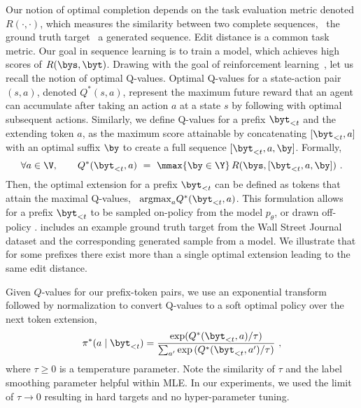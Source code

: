 Our notion of optimal completion depends on the task evaluation metric denoted $R(\cdot, \cdot)$, which measures
the similarity between two complete sequences, \eg~the ground truth
target \vs~a generated sequence. Edit distance is a common task metric.
Our goal in sequence learning is to train a model, which achieves high scores of $R(\bys,\byt)$.
Drawing  with the goal of reinforcement learning~\citep{suttonbarto98}, let us recall the notion of optimal Q-values.
Optimal Q-values for a state-action pair $(s,a)$, denoted $Q^*(s,a)$, represent the maximum future reward that an agent can accumulate
after taking an action $a$ at a state $s$ by following with optimal subsequent actions. Similarly, we define Q-values
for a prefix $\byt_{<t}$ and the extending token $a$, as the maximum score attainable by concatenating $[\byt_{<t}, a]$
with an optimal suffix $\by$ to create a full sequence $[\byt_{<t}, a, \by]$. Formally,
\begin{equation}
   \forall a \in \V,\qquad Q^*(\byt_{<t}, a) ~=~ \mmax{\by \in \Y} \,R(\bys, [\byt_{<t}, a, \by])~.
\label{eq:reward}
\end{equation}
Then, the optimal extension for a prefix $\byt_{<t}$ can be defined as tokens that attain the maximal Q-values,
\ie~$\mathrm{argmax}_{a} Q^*(\byt_{<t}, a)$. This formulation allows for a prefix $\byt_{<t}$ to be sampled
on-policy from the model $p_\theta$, or drawn off-policy .  includes an example ground truth target from the Wall Street Journal dataset and the corresponding
generated sample from a model. We illustrate that for some prefixes there exist more than a single optimal extension leading
to the same edit distance.

Given $Q$-values for our prefix-token pairs, we use an exponential transform followed by normalization %
to convert Q-values to a soft optimal policy over the next token extension, %
\begin{align}
    \pi^*(a \mid \byt_{<t}) = \frac{\exp ({Q^*(\byt_{<t}, a)}/\tau)}{\sum_{a'} \exp {(Q^*(\byt_{<t}, a')/\tau)}}~,
\label{eq:pis}
\end{align}
where $\tau \ge 0$ is a temperature parameter. Note the similarity of $\tau$ and the label smoothing parameter helpful within MLE.
In our experiments, we used the limit of $\tau \to 0$ resulting in hard targets and no hyper-parameter tuning.

